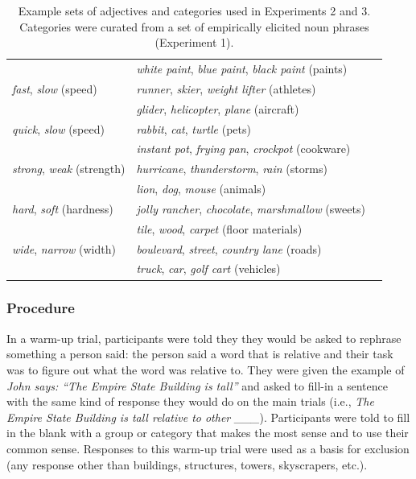 \documentclass[doc]{apa6}
\begin{document}
\begin{table}[ht]
\begin{tabularx}{\textwidth}{lll}
								  & \emph{white paint}, \emph{blue paint}, \emph{black paint}  (paints) \\  
   \emph{fast}, \emph{slow} (speed)   &  \emph{runner}, \emph{skier}, \emph{weight lifter} (athletes) \\
								  &  \emph{glider}, \emph{helicopter}, \emph{plane} (aircraft) \\
  \emph{quick}, \emph{slow} (speed) &  \emph{rabbit}, \emph{cat}, \emph{turtle} (pets) \\
							  &  \emph{instant pot}, \emph{frying pan}, \emph{crockpot} (cookware) \\
  \emph{strong}, \emph{weak} (strength) &  \emph{hurricane}, \emph{thunderstorm}, \emph{rain} (storms)\\
						  &  \emph{lion}, \emph{dog}, \emph{mouse} (animals)\\
  \emph{hard}, \emph{soft} (hardness) &  \emph{jolly rancher}, \emph{chocolate}, \emph{marshmallow} (sweets)\\
							  &  \emph{tile}, \emph{wood}, \emph{carpet} (floor materials)\\
  \emph{wide}, \emph{narrow} (width) & \emph{boulevard}, \emph{street}, \emph{country lane} (roads) \\
							  & \emph{truck}, \emph{car}, \emph{golf cart} (vehicles) \\
   \hline
\end{tabularx}
\caption{Example sets of adjectives and categories used in Experiments 2 and 3. 
Categories were curated from a set of empirically elicited noun phrases (Experiment 1).} 
\label{tab:1}
\endgroup
\end{table}



\subsubsection{Procedure}

In a warm-up trial, participants were told they they would be asked to rephrase something a person said:  the person said a word that is relative and their task was to figure out what the word was relative to. They were given the example of \emph{John says: ``The Empire State Building is tall''} and asked to fill-in a sentence with the same kind of response they would do on the main trials (i.e., \emph{The Empire State Building is tall relative to other \_\_\_}). Participants were told to fill in the blank with a group or category that makes the most sense and to use their common sense.
Responses to this warm-up trial were used as a basis for exclusion (any response other than buildings, structures, towers, skyscrapers, etc.). 
\end{document}
